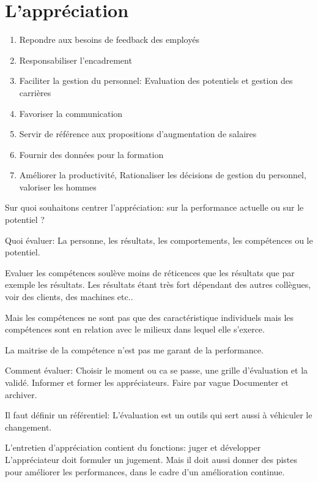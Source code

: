 \section{L'appréciation} \cite{gestionressourceshumaine2007}


\begin{enumerate}
    \item Repondre aux besoins de feedback des employés
    \item Responsabiliser l'encadrement
    \item Faciliter la gestion du personnel: Evaluation des potentiels et gestion des carrières
    \item Favoriser la communication
    \item Servir de référence aux propositions d'augmentation de salaires
    \item Fournir des données pour la formation
    \item Améliorer la productivité, Rationaliser les décisions de gestion du personnel, valoriser les hommes
\end{enumerate} 

Sur quoi souhaitons centrer l'appréciation: sur la performance actuelle ou sur le potentiel ? 

Quoi évaluer: La personne, les résultats, les comportements, les compétences ou le potentiel. 

Evaluer les compétences soulève moins de réticences que les résultats que par exemple les résultats. 
Les résultats étant très fort dépendant des autres collègues, voir des clients, des machines etc.. 

Mais les compétences ne sont pas que des caractéristique individuels mais les compétences sont en relation avec le milieux dans lequel elle s'exerce. 

La maitrise de la compétence n'est pas me garant de la performance. 

Comment évaluer: Choisir le moment ou ca se passe, une grille d'évaluation et la validé.
Informer et former les appréciateurs.
Faire par vague
Documenter et archiver.

Il faut définir un référentiel: L'évaluation est un outils qui sert aussi à véhiculer le changement. 

L'entretien d'appréciation contient du fonctions: juger et développer 
L'appréciateur doit formuler un jugement. 
Mais il doit aussi donner des pistes pour améliorer les performances, dans le cadre d'un amélioration continue.

